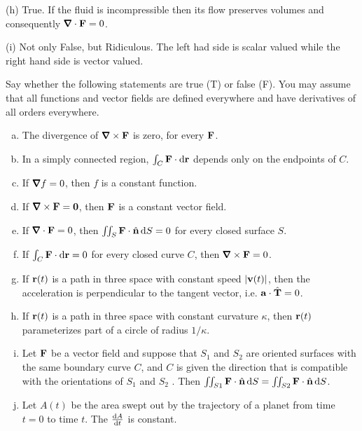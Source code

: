 \begin{solution}
(h) True. If the fluid is incompressible then its flow preserves volumes
and consequently $\vnabla\cdot\vF=0$.

(i) Not only False, but Ridiculous. The left had side is  scalar valued
while the right hand side is vector valued.

\end{solution}

\begin{question}[M317 2005D] %
Say whether the following statements are true (T) or false
(F). You may assume that all functions and vector fields are defined 
everywhere and have derivatives of all orders everywhere.


\begin{enumerate}[(a)]
\item
The divergence of $\vnabla\times\vF$ is zero, for every $\mathbf{F}$.
\item
In a simply connected region, $\int_C \mathbf{F}\cdot\mathrm{d}\mathbf{r}$ 
depends only on the endpoints of $C$.
\item
If $\vnabla f = 0$, then $f$ is a constant function.
\item
If $\vnabla\times\vF = \vZero$, then $\mathbf{F}$ is a constant vector field.
\item
If $\vnabla\cdot\vF = 0$, then $\iint_S\mathbf{F}\cdot\hat{\mathbf{n}}\, \mathrm{d}S = 0$ 
for every closed surface $S$.
\item
If $\int_C \mathbf{F}\cdot \mathrm{d}\mathbf{r} = 0$ for every closed curve $C$, then 
$\vnabla \times\vF = 0$.
\item
If $\mathbf{r}(t)$ is a path in three space with constant speed $|\mathbf{v}(t)|$, 
then the acceleration is perpendicular to the tangent vector, i.e. 
$\mathbf{a}\cdot\hat{\mathbf{T}} = 0$.
\item
If $\mathbf{r}(t)$ is a path in three space with constant curvature $\kappa$, 
then $\mathbf{r}(t)$ parameterizes part of a circle of radius $1/\kappa$.
\item
Let $\mathbf{F}$ be a vector field and suppose that $S_1$ and $S_2$ 
are oriented surfaces with the same boundary curve $C$, and $C$ 
is given the direction that is compatible with the orientations
of $S_1$ and $S_2$ . Then $\iint_{S 1} \mathbf{F}\cdot\hat{\mathbf{n}}\, \mathrm{d}S 
= \iint_{S 2} \mathbf{F}\cdot\hat{\mathbf{n}}\, \mathrm{d}S$.
\item
Let $A(t)$ be the area swept out by the trajectory of a planet from time 
$t=0$ to time $t$. The $\diff{A}{t}$ is constant.
\end{enumerate}

\end{question}

